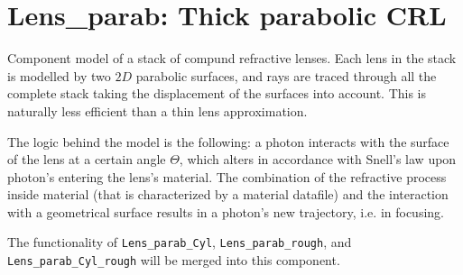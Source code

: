\section{Lens\_parab: Thick parabolic CRL}

Component model of a stack of compund refractive lenses. Each lens in the stack
is modelled by two $2D$ parabolic surfaces, and rays are traced through all the
complete stack taking the displacement of the surfaces into account. This is
naturally less efficient than a thin lens approximation.

The logic behind the model is the following: a photon interacts with the
surface of the lens at a certain angle $\Theta$, which alters in accordance
with Snell's law upon photon's entering the lens's material. The combination of
the refractive process inside material (that is characterized by a material
datafile) and the interaction with a geometrical surface results in a photon's
new trajectory, i.e. in focusing.

The functionality of \texttt{Lens\_parab\_Cyl}, \texttt{Lens\_parab\_rough},
and \texttt{Lens\_parab\_Cyl\_rough} will be merged into this component.
